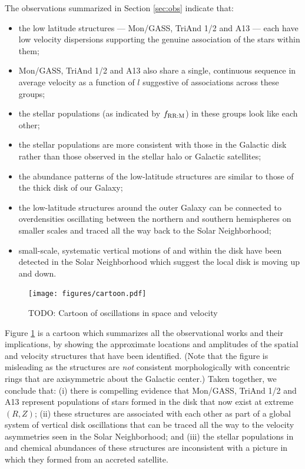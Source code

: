 \documentclass[galaxies,article,submit,moreauthors,pdftex,10pt,a4paper]{mdpi}
\begin{document}
The observations summarized in Section \ref{sec:obs} indicate that:
\begin{itemize}
\item the low latitude structures --- Mon/GASS, TriAnd 1/2 and A13  --- each have low velocity dispersions supporting the genuine association of the stars within them;
\item Mon/GASS, TriAnd 1/2 and A13 also share a single, continuous sequence in average velocity as a function of $l$ suggestive of associations across these groups;
\item the stellar populations (as indicated by $f_{\rm RR:M}$) in these groups look like each other;
\item the stellar populations are more consistent with those in the Galactic disk rather than those observed in the stellar halo or Galactic  satellites;
\item the abundance patterns  of the low-latitude structures are similar to those of the thick disk of our Galaxy;
\item the low-latitude structures around the outer Galaxy can be connected to overdensities oscillating between the northern and southern hemispheres on smaller scales and traced all the way back to the Solar Neighborhood;
\item small-scale, systematic vertical motions of and within the disk have been detected in the Solar Neighborhood which suggest the local disk is moving up and down.
\end{itemize}

\begin{figure}[t]
\centering
\texttt{[image: figures/cartoon.pdf]}
\caption{\label{fig:cartoon}
TODO: Cartoon of oscillations in space and velocity}
\end{figure}

Figure \ref{fig:cartoon} is a cartoon which summarizes all the observational works and their implications, by showing the approximate locations and amplitudes of the spatial and velocity structures that have been identified. (Note that the figure is misleading as the structures are {\it not} consistent morphologically with concentric rings that are axisymmetric about the Galactic center.)
Taken together, we conclude that: (i) there is compelling evidence that Mon/GASS, TriAnd 1/2 and A13 represent populations of stars formed in the disk that now exist at extreme $(R,Z)$;
(ii) these structures are associated with each other as part of a global system of vertical disk oscillations that can be traced all the way to the velocity asymmetries seen in the Solar Neighborhood; and
(iii) the stellar populations in and chemical abundances of these structures are inconsistent with a picture in which they formed from an accreted satellite.
\end{document}
